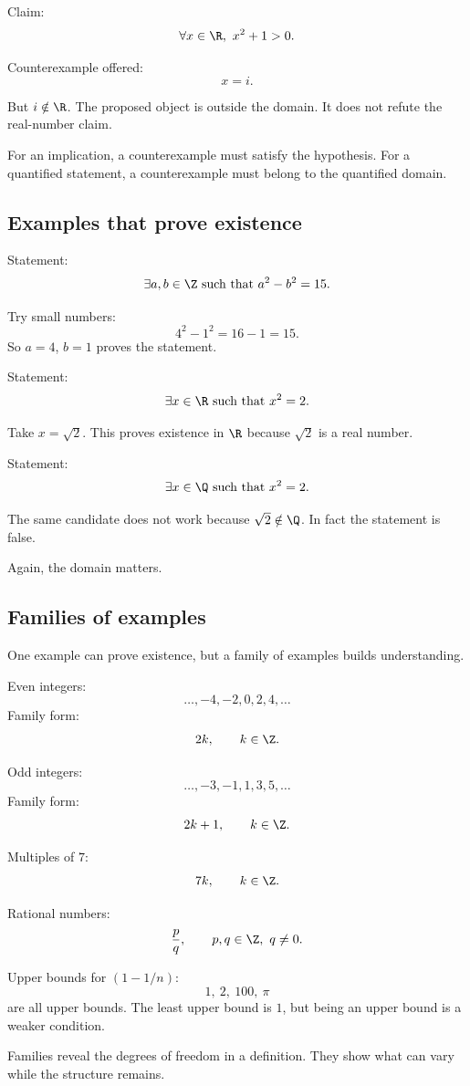 Claim:
\[
\forall x\in\R,\ x^2+1>0.
\]

Counterexample offered:
\[
x=i.
\]

But $i\notin\R$. The proposed object is outside the domain. It does not refute the real-number claim.

\begin{trapbox}
For an implication, a counterexample must satisfy the hypothesis. For a quantified statement, a counterexample must belong to the quantified domain.
\end{trapbox}

\subsection{Examples that prove existence}

Statement:
\[
\exists a,b\in\Z\text{ such that }a^2-b^2=15.
\]

Try small numbers:
\[
4^2-1^2=16-1=15.
\]
So $a=4$, $b=1$ proves the statement.

Statement:
\[
\exists x\in\R\text{ such that }x^2=2.
\]

Take $x=\sqrt2$. This proves existence in $\R$ because $\sqrt2$ is a real number.

Statement:
\[
\exists x\in\Q\text{ such that }x^2=2.
\]

The same candidate does not work because $\sqrt2\notin\Q$. In fact the statement is false.

Again, the domain matters.

\subsection{Families of examples}

One example can prove existence, but a family of examples builds understanding.

Even integers:
\[
\ldots,-4,-2,0,2,4,\ldots
\]
Family form:
\[
2k,\qquad k\in\Z.
\]

Odd integers:
\[
\ldots,-3,-1,1,3,5,\ldots
\]
Family form:
\[
2k+1,\qquad k\in\Z.
\]

Multiples of $7$:
\[
7k,\qquad k\in\Z.
\]

Rational numbers:
\[
\frac pq,\qquad p,q\in\Z,\ q\neq0.
\]

Upper bounds for $(1-1/n)$:
\[
1,\ 2,\ 100,\ \pi
\]
are all upper bounds. The least upper bound is $1$, but being an upper bound is a weaker condition.

Families reveal the degrees of freedom in a definition. They show what can vary while the structure remains.

